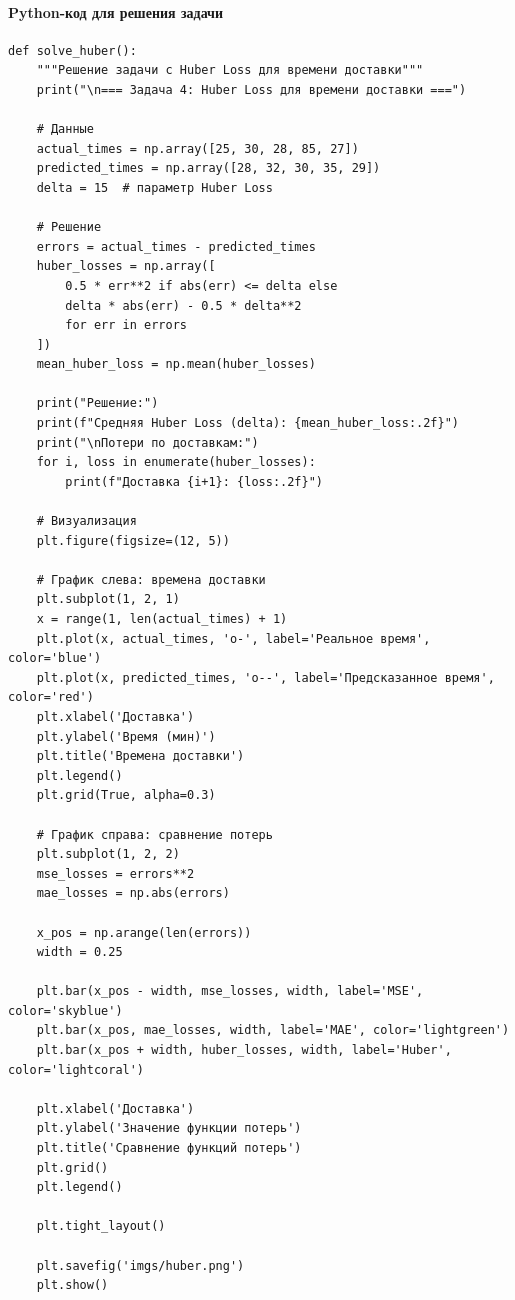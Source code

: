 \documentclass[12pt]{article}
\theoremstyle{definition}
\theoremstyle{definition}
\theoremstyle{definition}
\theoremstyle{remark}
\theoremstyle{remark}
\begin{document}
\paragraph*{Python-код для решения задачи}

\begin{verbatim}
def solve_huber():
    """Решение задачи с Huber Loss для времени доставки"""
    print("\n=== Задача 4: Huber Loss для времени доставки ===")
    
    # Данные
    actual_times = np.array([25, 30, 28, 85, 27])
    predicted_times = np.array([28, 32, 30, 35, 29])
    delta = 15  # параметр Huber Loss
    
    # Решение
    errors = actual_times - predicted_times
    huber_losses = np.array([
        0.5 * err**2 if abs(err) <= delta else
        delta * abs(err) - 0.5 * delta**2
        for err in errors
    ])
    mean_huber_loss = np.mean(huber_losses)
    
    print("Решение:")
    print(f"Средняя Huber Loss (delta): {mean_huber_loss:.2f}")
    print("\nПотери по доставкам:")
    for i, loss in enumerate(huber_losses):
        print(f"Доставка {i+1}: {loss:.2f}")
    
    # Визуализация
    plt.figure(figsize=(12, 5))
    
    # График слева: времена доставки
    plt.subplot(1, 2, 1)
    x = range(1, len(actual_times) + 1)
    plt.plot(x, actual_times, 'o-', label='Реальное время', color='blue')
    plt.plot(x, predicted_times, 'o--', label='Предсказанное время', color='red')
    plt.xlabel('Доставка')
    plt.ylabel('Время (мин)')
    plt.title('Времена доставки')
    plt.legend()
    plt.grid(True, alpha=0.3)
    
    # График справа: сравнение потерь
    plt.subplot(1, 2, 2)
    mse_losses = errors**2
    mae_losses = np.abs(errors)
    
    x_pos = np.arange(len(errors))
    width = 0.25
    
    plt.bar(x_pos - width, mse_losses, width, label='MSE', color='skyblue')
    plt.bar(x_pos, mae_losses, width, label='MAE', color='lightgreen')
    plt.bar(x_pos + width, huber_losses, width, label='Huber', color='lightcoral')
    
    plt.xlabel('Доставка')
    plt.ylabel('Значение функции потерь')
    plt.title('Сравнение функций потерь')
    plt.grid()
    plt.legend()
    
    plt.tight_layout()
    
    plt.savefig('imgs/huber.png')
    plt.show()
\end{verbatim}
\end{document}

